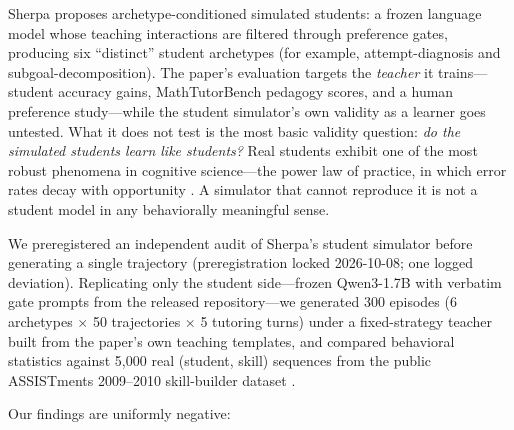 \documentclass[12pt,a4paper]{article}
\begin{document}
Sherpa \citep{xu2026sherpa} proposes archetype-conditioned simulated
students: a frozen language model whose teaching interactions are filtered
through preference gates, producing six ``distinct'' student archetypes (for
example, attempt-diagnosis and subgoal-decomposition). The paper's evaluation
targets the \emph{teacher} it trains---student accuracy gains, MathTutorBench
pedagogy scores, and a human preference study---while the student simulator's
own validity as a learner goes untested. What it does not test is the most
basic validity question: \emph{do the simulated students learn like
students?} Real students exhibit
one of the most robust phenomena in cognitive science---the power law of
practice, in which error rates decay with opportunity \citep{newell1981}. A
simulator that cannot reproduce it is not a student model in any behaviorally
meaningful sense.

We preregistered an independent audit of Sherpa's student simulator before
generating a single trajectory (preregistration locked 2026-10-08; one logged
deviation). Replicating only the student side---frozen Qwen3-1.7B with
verbatim gate prompts from the released repository---we generated 300
episodes (6 archetypes $\times$ 50 trajectories $\times$ 5 tutoring turns)
under a fixed-strategy teacher built from the paper's own teaching templates,
and compared behavioral statistics against 5{,}000 real (student, skill)
sequences from the public ASSISTments 2009--2010 skill-builder dataset
\citep{feng2009}.

Our findings are uniformly negative:
\end{document}
